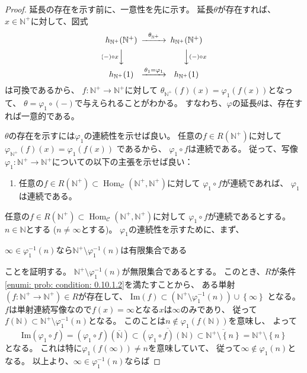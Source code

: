 \documentclass[uplatex]{jsarticle}
\theoremstyle{definition}
\DeclareMathOperator{\Hom}{Hom}
\newcommand{\im}{\mathrm{Im}}
\def\N{\mathbb{N}}
\def\mcC{\mathcal{C}}
\begin{document}
\begin{proof}
  延長の存在を示す前に、一意性を先に示す。
  延長\(\theta\)が存在すれば、
  \(x\in \N^+\)に対して、図式
  \[
  \begin{CD}
    h_{\N^+}(\N^+) @>\theta_{\N^+}>> h_{\N^+}(\N^+) \\
    @V(-)\circ x VV @VV(-)\circ x V \\
    h_{\N^+}(1) @>\theta_1 = \varphi_1>> h_{\N^+}(1)
  \end{CD}
  \]
  は可換であるから、
  \(f:\N^+\to \N^+\)に対して
  \(\theta_{\N^+}(f)(x) = \varphi_1(f(x))\)となって、
  \(\theta=\varphi_1\circ (-)\)で与えられることがわかる。
  すなわち、\(\varphi\)の延長\(\theta\)は、存在すれば一意的である。

  \(\theta\)の存在を示すには\(\varphi_1\)の連続性を示せば良い。
  任意の\(f\in R(\N^+)\)に対して
  \(\varphi_{\N^+}(f)(x) = \varphi_1(f(x))\)
  であるから、
  \(\varphi_1\circ f\)は連続である。
  従って、写像\(\varphi_1:\N^+\to \N^+\)についての以下の主張を示せば良い：
  \begin{enumerate}
    \item \label{enumi: proof: prob: 0.10.1 conti-assertion}
    任意の\(f\in R(\N^+)\subset \Hom_{\mcC}(\N^+,\N^+)\)に対して
    \(\varphi_1\circ f\)が連続であれば、
    \(\varphi_1\)は連続である。
  \end{enumerate}
  任意の\(f\in R(\N^+)\subset \Hom_{\mcC}(\N^+,\N^+)\)に対して
  \(\varphi_1\circ f\)が連続であるとする。
  \(n\in \N\)とする (\(n\neq \infty\)とする)。
  \(\varphi_1\)の連続性を示すために、まず、
  \begin{center}
    \(\infty\in \varphi_1^{-1}(n)\)なら\(\N^+\setminus \varphi_1^{-1}(n)\)は有限集合である
  \end{center}
  ことを証明する。
  \(\N^+\setminus\varphi_1^{-1}(n)\)が無限集合であるとする。
  このとき、\(R\)が条件\ref{enumi: prob: condition: 0.10.1.2}を満たすことから、
  ある単射\((f:\N^+\to \N^+)\in R\)が存在して、
  \(\im(f) \subset (\N^+\setminus \varphi_1^{-1}(n))\cup\left\{ \infty\right\}\)
  となる。
  \(f\)は単射連続写像なので\(f(x)=\infty\)となる\(x\)は\(\infty\)のみであり、
  従って
  \(f(\N)\subset \N^+\setminus \varphi_1^{-1}(n)\)となる。
  このことは\(n\not\in \varphi_1(f(\N))\)を意味し、
  よって
  \[
  \im(\varphi_1\circ f) = (\varphi_1\circ f)(\overline{\N})
  \subset \overline{(\varphi_1\circ f)(\N)}
  \subset \overline{\N^+ \setminus \left\{ n\right\}}
  = \N^+ \setminus \left\{ n\right\}
  \]
  となる。
  これは特に\(\varphi_1(f(\infty)) \neq n\)を意味していて、
  従って\(\infty \not\in \varphi_1(n)\)となる。
  以上より、\(\infty\in \varphi_1^{-1}(n)\)ならば

\end{proof}
\end{document}
